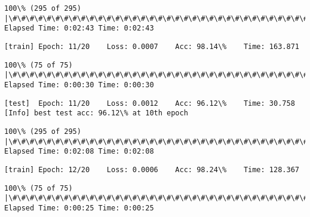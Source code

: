 \documentclass[11pt]{article}
\begin{document}
    \begin{Verbatim}[commandchars=\\\{\}]
100\% (295 of 295) |\#\#\#\#\#\#\#\#\#\#\#\#\#\#\#\#\#\#\#\#\#\#\#\#\#\#\#\#\#\#\#\#\#\#\#\#\#\#\#\#\#\#\#\#\#\#\#\#\#\#\#\#\#\#\#\#\#\#\#\#\#\#\#| Elapsed Time: 0:02:43 Time: 0:02:43

    \end{Verbatim}

    \begin{Verbatim}[commandchars=\\\{\}]
[train]	Epoch: 11/20	Loss: 0.0007	Acc: 98.14\%	Time: 163.871

    \end{Verbatim}

    \begin{Verbatim}[commandchars=\\\{\}]
100\% (75 of 75) |\#\#\#\#\#\#\#\#\#\#\#\#\#\#\#\#\#\#\#\#\#\#\#\#\#\#\#\#\#\#\#\#\#\#\#\#\#\#\#\#\#\#\#\#\#\#\#\#\#\#\#\#\#\#\#\#\#\#\#\#\#\#\#\#\#| Elapsed Time: 0:00:30 Time: 0:00:30

    \end{Verbatim}

    \begin{Verbatim}[commandchars=\\\{\}]
[test]	Epoch: 11/20	Loss: 0.0012	Acc: 96.12\%	Time: 30.758
[Info] best test acc: 96.12\% at 10th epoch

    \end{Verbatim}

    \begin{Verbatim}[commandchars=\\\{\}]
100\% (295 of 295) |\#\#\#\#\#\#\#\#\#\#\#\#\#\#\#\#\#\#\#\#\#\#\#\#\#\#\#\#\#\#\#\#\#\#\#\#\#\#\#\#\#\#\#\#\#\#\#\#\#\#\#\#\#\#\#\#\#\#\#\#\#\#\#| Elapsed Time: 0:02:08 Time: 0:02:08

    \end{Verbatim}

    \begin{Verbatim}[commandchars=\\\{\}]
[train]	Epoch: 12/20	Loss: 0.0006	Acc: 98.24\%	Time: 128.367

    \end{Verbatim}

    \begin{Verbatim}[commandchars=\\\{\}]
100\% (75 of 75) |\#\#\#\#\#\#\#\#\#\#\#\#\#\#\#\#\#\#\#\#\#\#\#\#\#\#\#\#\#\#\#\#\#\#\#\#\#\#\#\#\#\#\#\#\#\#\#\#\#\#\#\#\#\#\#\#\#\#\#\#\#\#\#\#\#| Elapsed Time: 0:00:25 Time: 0:00:25

    \end{Verbatim}
\end{document}
